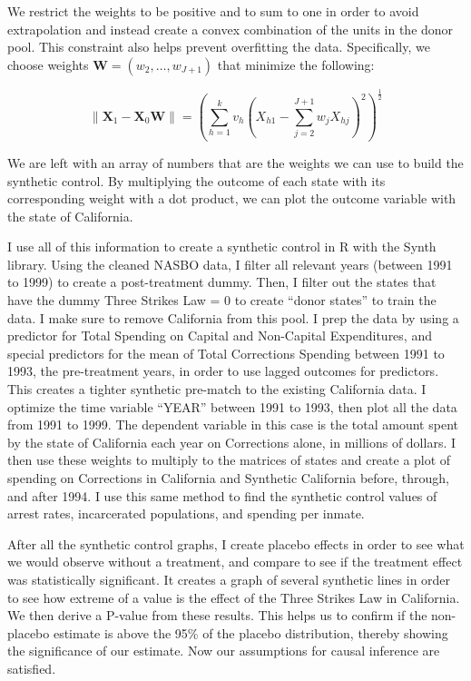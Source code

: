 \documentclass[12pt]{article}
\begin{document}
    We restrict the weights to be positive and to sum to one in order to avoid extrapolation and instead create a convex combination of the units in the donor pool. This constraint also helps prevent overfitting the data. Specifically, we choose weights $\mathbf{W} = (w_2, \ldots, w_{J+1})$ that minimize the following:


\begin{equation*}
\left\| \mathbf{X}_1 - \mathbf{X}_0 \mathbf{W} \right\| = 
\left( \sum_{h=1}^{k} v_h \left( X_{h1} - \sum_{j=2}^{J+1} w_j X_{hj} \right)^2 \right)^{\frac{1}{2}}
\end{equation*}

    We are left with an array of numbers that are the weights we can use to build the synthetic control. By multiplying the outcome of each state with its corresponding weight with a dot product, we can plot the outcome variable with the state of California. 

    I use all of this information to create a synthetic control in R with the Synth library. Using the cleaned NASBO data, I filter all relevant years (between 1991 to 1999) to create a post-treatment dummy. Then, I filter out the states that have the dummy Three Strikes Law = 0 to create “donor states” to train the data. I make sure to remove California from this pool. I prep the data by using a predictor for Total Spending on Capital and Non-Capital Expenditures, and special predictors for the mean of Total Corrections Spending between 1991 to 1993, the pre-treatment years, in order to use lagged outcomes for predictors. This creates a tighter synthetic pre-match to the existing California data. I optimize the time variable “YEAR” between 1991 to 1993, then plot all the data from 1991 to 1999. The dependent variable in this case is the total amount spent by the state of California each year on Corrections alone, in millions of dollars. I then use these weights to multiply to the matrices of states and create a plot of spending on Corrections in California and Synthetic California before, through, and after 1994. I use this same method to find the synthetic control values of arrest rates, incarcerated populations, and spending per inmate.

    After all the synthetic control graphs, I create placebo effects in order to see what we would observe without a treatment, and compare to see if the treatment effect was statistically significant. It creates a graph of several synthetic lines in order to see how extreme of a value is the effect of the Three Strikes Law in California. We then derive a P-value from these results. This helps us to confirm if the non-placebo estimate is above the 95\% of the placebo distribution, thereby showing the significance of our estimate. Now our assumptions for causal inference are satisfied.
\end{document}
